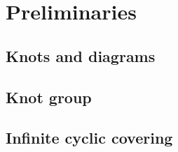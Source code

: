 \section{Preliminaries}

\subsection{Knots and diagrams}



\subsection{Knot group}



\subsection{Infinite cyclic covering}


